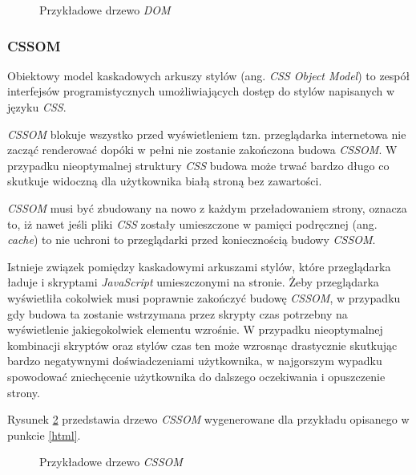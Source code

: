 \documentclass[polish, twoside, 12pt]{mwart}
\begin{document}
\begin{figure}
  \centering
  \caption{Przykładowe drzewo \emph{DOM}}
  \label{fig:example-page-dom}
\end{figure}

\subsubsection{CSSOM} \label{cssom}

Obiektowy model kaskadowych arkuszy stylów (ang. \emph{CSS Object Model}) to zespół interfejsów programistycznych umożliwiających dostęp do stylów napisanych w języku \emph{CSS}.

\emph{CSSOM} blokuje wszystko przed wyświetleniem tzn. przeglądarka internetowa nie zacząć renderować dopóki w pełni nie zostanie zakończona budowa \emph{CSSOM}. W przypadku nieoptymalnej struktury \emph{CSS} budowa może trwać bardzo długo co skutkuje widoczną dla użytkownika białą stroną bez zawartości.

\emph{CSSOM} musi być zbudowany na nowo z każdym przeładowaniem strony, oznacza to, iż nawet jeśli pliki \emph{CSS} zostały umieszczone w pamięci podręcznej (ang. \emph{cache}) to nie uchroni to przeglądarki przed koniecznością budowy \emph{CSSOM}.

Istnieje związek pomiędzy kaskadowymi arkuszami stylów, które przeglądarka ładuje i skryptami \emph{JavaScript} umieszczonymi na stronie. Żeby przeglądarka wyświetliła cokolwiek musi poprawnie zakończyć budowę \emph{CSSOM}, w przypadku gdy budowa ta zostanie wstrzymana przez skrypty czas potrzebny na wyświetlenie jakiegokolwiek elementu wzrośnie. W przypadku nieoptymalnej kombinacji skryptów oraz stylów czas ten może wzrosnąc drastycznie skutkując bardzo negatywnymi doświadczeniami użytkownika, w najgorszym wypadku spowodować zniechęcenie użytkownika do dalszego oczekiwania i opuszczenie strony.

Rysunek \ref{fig:example-page-cssom} przedstawia drzewo \emph{CSSOM} wygenerowane dla przykładu opisanego w punkcie \ref{html}.

\begin{figure}
  \centering
  \caption{Przykładowe drzewo \emph{CSSOM}}
  \label{fig:example-page-cssom}
\end{figure}
\end{document}
